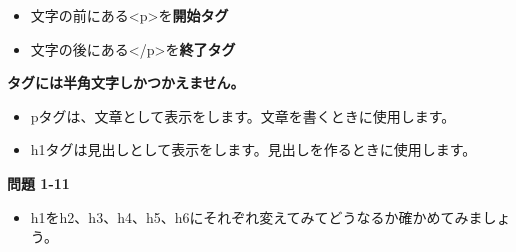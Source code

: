 \documentclass[a4paper,12pt]{jarticle}
\begin{document}
\begin{itemize}
  \item 文字の前にある{\textless}p{\textgreater}を\textbf{開始タグ}
  \item 文字の後にある{\textless}/p{\textgreater}を\textbf{終了タグ}
\end{itemize}

\textbf{タグには半角文字しかつかえません。}

\begin{itemize}
  \item pタグは、文章として表示をします。文章を書くときに使用します。

  \item h1タグは見出しとして表示をします。見出しを作るときに使用します。
\end{itemize}


\vfill

{\bfseries
  問題 1-11}

\begin{itemize}
  \item[]
    h1をh2、h3、h4、h5、h6にそれぞれ変えてみてどうなるか確かめてみましょう。
\end{itemize}

\bigskip
\end{document}
